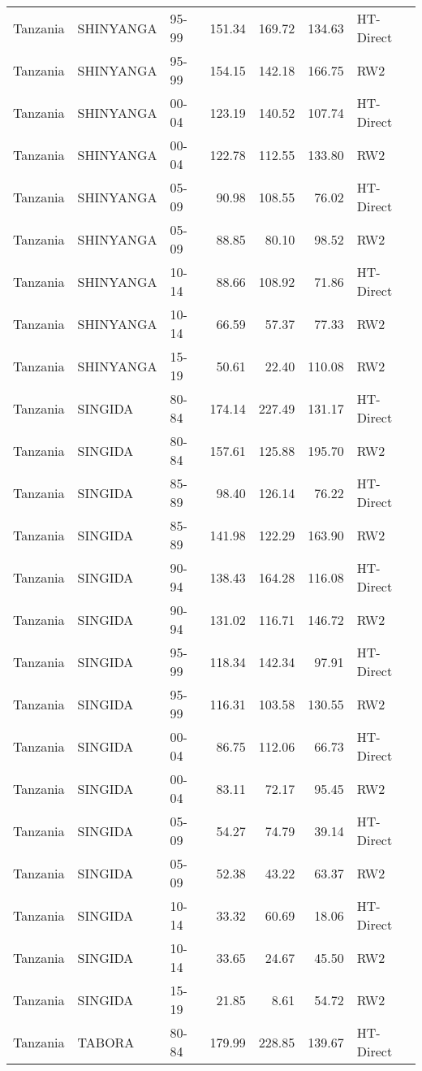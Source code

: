 \begin{longtable}{lllrrrl}
  Tanzania & SHINYANGA & 95-99 & 151.34 & 169.72 & 134.63 & HT-Direct \\ 
  Tanzania & SHINYANGA & 95-99 & 154.15 & 142.18 & 166.75 & RW2 \\ 
  Tanzania & SHINYANGA & 00-04 & 123.19 & 140.52 & 107.74 & HT-Direct \\ 
  Tanzania & SHINYANGA & 00-04 & 122.78 & 112.55 & 133.80 & RW2 \\ 
  Tanzania & SHINYANGA & 05-09 & 90.98 & 108.55 & 76.02 & HT-Direct \\ 
  Tanzania & SHINYANGA & 05-09 & 88.85 & 80.10 & 98.52 & RW2 \\ 
  Tanzania & SHINYANGA & 10-14 & 88.66 & 108.92 & 71.86 & HT-Direct \\ 
  Tanzania & SHINYANGA & 10-14 & 66.59 & 57.37 & 77.33 & RW2 \\ 
  Tanzania & SHINYANGA & 15-19 & 50.61 & 22.40 & 110.08 & RW2 \\ 
  Tanzania & SINGIDA & 80-84 & 174.14 & 227.49 & 131.17 & HT-Direct \\ 
  Tanzania & SINGIDA & 80-84 & 157.61 & 125.88 & 195.70 & RW2 \\ 
  Tanzania & SINGIDA & 85-89 & 98.40 & 126.14 & 76.22 & HT-Direct \\ 
  Tanzania & SINGIDA & 85-89 & 141.98 & 122.29 & 163.90 & RW2 \\ 
  Tanzania & SINGIDA & 90-94 & 138.43 & 164.28 & 116.08 & HT-Direct \\ 
  Tanzania & SINGIDA & 90-94 & 131.02 & 116.71 & 146.72 & RW2 \\ 
  Tanzania & SINGIDA & 95-99 & 118.34 & 142.34 & 97.91 & HT-Direct \\ 
  Tanzania & SINGIDA & 95-99 & 116.31 & 103.58 & 130.55 & RW2 \\ 
  Tanzania & SINGIDA & 00-04 & 86.75 & 112.06 & 66.73 & HT-Direct \\ 
  Tanzania & SINGIDA & 00-04 & 83.11 & 72.17 & 95.45 & RW2 \\ 
  Tanzania & SINGIDA & 05-09 & 54.27 & 74.79 & 39.14 & HT-Direct \\ 
  Tanzania & SINGIDA & 05-09 & 52.38 & 43.22 & 63.37 & RW2 \\ 
  Tanzania & SINGIDA & 10-14 & 33.32 & 60.69 & 18.06 & HT-Direct \\ 
  Tanzania & SINGIDA & 10-14 & 33.65 & 24.67 & 45.50 & RW2 \\ 
  Tanzania & SINGIDA & 15-19 & 21.85 & 8.61 & 54.72 & RW2 \\ 
  Tanzania & TABORA & 80-84 & 179.99 & 228.85 & 139.67 & HT-Direct \\ 

\end{longtable}
